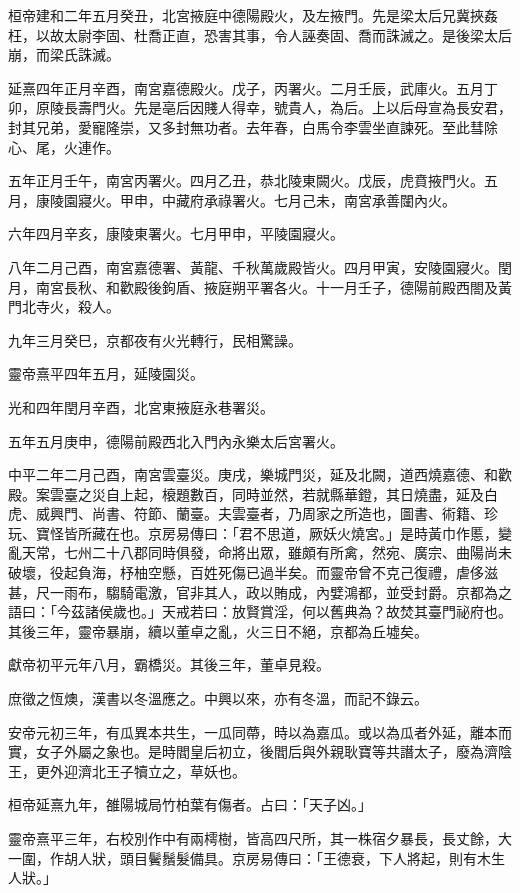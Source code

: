\begin{pinyinscope}
桓帝建和二年五月癸丑，北宮掖庭中德陽殿火，及左掖門。先是梁太后兄冀挾姦枉，以故太尉李固、杜喬正直，恐害其事，令人誣奏固、喬而誅滅之。是後梁太后崩，而梁氏誅滅。

延熹四年正月辛酉，南宮嘉德殿火。戊子，丙署火。二月壬辰，武庫火。五月丁卯，原陵長壽門火。先是亳后因賤人得幸，號貴人，為后。上以后母宣為長安君，封其兄弟，愛寵隆崇，又多封無功者。去年春，白馬令李雲坐直諫死。至此彗除心、尾，火連作。

五年正月壬午，南宮丙署火。四月乙丑，恭北陵東闕火。戊辰，虎賁掖門火。五月，康陵園寢火。甲申，中藏府承祿署火。七月己未，南宮承善闥內火。

六年四月辛亥，康陵東署火。七月甲申，平陵園寢火。

八年二月己酉，南宮嘉德署、黃龍、千秋萬歲殿皆火。四月甲寅，安陵園寢火。閏月，南宮長秋、和歡殿後鉤盾、掖庭朔平署各火。十一月壬子，德陽前殿西閤及黃門北寺火，殺人。

九年三月癸巳，京都夜有火光轉行，民相驚譟。

靈帝熹平四年五月，延陵園災。

光和四年閏月辛酉，北宮東掖庭永巷署災。

五年五月庚申，德陽前殿西北入門內永樂太后宮署火。

中平二年二月己酉，南宮雲臺災。庚戌，樂城門災，延及北闕，道西燒嘉德、和歡殿。案雲臺之災自上起，榱題數百，同時並然，若就縣華鐙，其日燒盡，延及白虎、威興門、尚書、符節、蘭臺。夫雲臺者，乃周家之所造也，圖書、術籍、珍玩、寶怪皆所藏在也。京房易傳曰：「君不思道，厥妖火燒宮。」是時黃巾作慝，變亂天常，七州二十八郡同時俱發，命將出眾，雖頗有所禽，然宛、廣宗、曲陽尚未破壞，役起負海，杼柚空懸，百姓死傷已過半矣。而靈帝曾不克己復禮，虐侈滋甚，尺一雨布，騶騎電激，官非其人，政以賄成，內嬖鴻都，並受封爵。京都為之語曰：「今茲諸侯歲也。」天戒若曰：放賢賞淫，何以舊典為？故焚其臺門祕府也。其後三年，靈帝暴崩，續以董卓之亂，火三日不絕，京都為丘墟矣。

獻帝初平元年八月，霸橋災。其後三年，董卓見殺。

庶徵之恆燠，漢書以冬溫應之。中興以來，亦有冬溫，而記不錄云。

安帝元初三年，有瓜異本共生，一瓜同蔕，時以為嘉瓜。或以為瓜者外延，離本而實，女子外屬之象也。是時閻皇后初立，後閻后與外親耿寶等共譖太子，廢為濟陰王，更外迎濟北王子犢立之，草妖也。

桓帝延熹九年，雒陽城局竹柏葉有傷者。占曰：「天子凶。」

靈帝熹平三年，右校別作中有兩樗樹，皆高四尺所，其一株宿夕暴長，長丈餘，大一圍，作胡人狀，頭目鬢鬚髮備具。京房易傳曰：「王德衰，下人將起，則有木生人狀。」


\end{pinyinscope}
